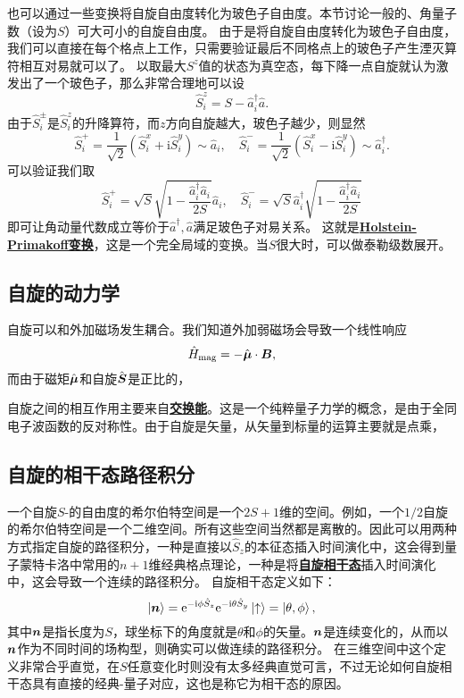 \documentclass[hyperref, UTF8, a4paper]{ctexart}
\newcommand*{\ii}{\mathrm{i}}
\newcommand*{\ee}{\mathrm{e}}
\newcommand*{\concept}[1]{\underline{\textbf{#1}}}
\begin{document}
也可以通过一些变换将自旋自由度转化为玻色子自由度。本节讨论一般的、角量子数（设为$S$）可大可小的自旋自由度。
由于是将自旋自由度转化为玻色子自由度，我们可以直接在每个格点上工作，只需要验证最后不同格点上的玻色子产生湮灭算符相互对易就可以了。
以取最大$S^z$值的状态为真空态，每下降一点自旋就认为激发出了一个玻色子，那么非常合理地可以设
\[
    \hat{S}_i^z = S - \hat{a}^\dagger_i \hat{a}.
\]
由于$\hat{S}_i^\pm$是$\hat{S}^z_i$的升降算符，而$z$方向自旋越大，玻色子越少，则显然
\[
    \hat{S}_i^+ = \frac{1}{\sqrt{2}} (\hat{S}^x_i + \ii \hat{S}^y_i) \sim \hat{a}_i, \quad \hat{S}_i^- = \frac{1}{\sqrt{2}} (\hat{S}^x_i - \ii \hat{S}^y_i) \sim \hat{a}_i^\dagger.
\]
可以验证我们取
\begin{equation}
    \hat{S}^+_i = \sqrt{S} \sqrt{1 - \frac{\hat{a}_i^\dagger \hat{a}_i}{2S}} \hat{a}_i, \quad \hat{S}^-_i = \sqrt{S} \hat{a}_i^\dagger \sqrt{1 - \frac{\hat{a}_i^\dagger \hat{a}_i}{2S}}
\end{equation}
即可让角动量代数成立等价于$\hat{a}^\dagger, \hat{a}$满足玻色子对易关系。
这就是\concept{Holstein-Primakoff变换}，这是一个完全局域的变换。当$S$很大时，可以做泰勒级数展开。

\subsection{自旋的动力学}

自旋可以和外加磁场发生耦合。我们知道外加弱磁场会导致一个线性响应
\[
    \hat{H}_\text{mag} = - \hat{\vb*{\mu}} \cdot \vb*{B},
\]
而由于磁矩$\hat{\vb*{\mu}}$和自旋$\hat{\vb*{S}}$是正比的，

自旋之间的相互作用主要来自\concept{交换能}。这是一个纯粹量子力学的概念，是由于全同电子波函数的反对称性。由于自旋是矢量，从矢量到标量的运算主要就是点乘，

\subsection{自旋的相干态路径积分}

一个自旋$S$-的自由度的希尔伯特空间是一个$2S+1$维的空间。例如，一个$1/2$自旋的希尔伯特空间是一个二维空间。所有这些空间当然都是离散的。因此可以用两种方式指定自旋的路径积分，一种是直接以$\hat{S}_z$的本征态插入时间演化中，这会得到量子蒙特卡洛中常用的$n+1$维经典格点理论，一种是将\concept{自旋相干态}插入时间演化中，这会导致一个连续的路径积分。
自旋相干态定义如下：
\begin{equation}
    \ket{\vb*{n}} = \ee^{- \ii \phi \hat{S}_z} \ee^{- \ii \theta \hat{S}_y} \ket{\uparrow} = \ket{\theta, \phi},
\end{equation}
其中$\vb*{n}$是指长度为$S$，球坐标下的角度就是$\theta$和$\phi$的矢量。$\vb*{n}$是连续变化的，从而以$\vb*{n}$作为不同时间的场构型，则确实可以做连续的路径积分。
在三维空间中这个定义非常合乎直觉，在$S$任意变化时则没有太多经典直觉可言，不过无论如何自旋相干态具有直接的经典-量子对应，这也是称它为相干态的原因。
\end{document}
